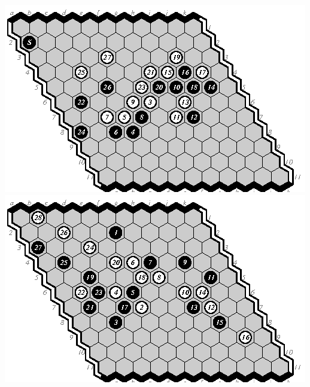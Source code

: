 \documentclass{icga}
\begin{document}
\newpage
\includegraphics[scale=1.3]{m-tony.swap.eps}\hspace*{-2cm}\includegraphics[scale=1.3]{tony-m.eps}
\end{document}
